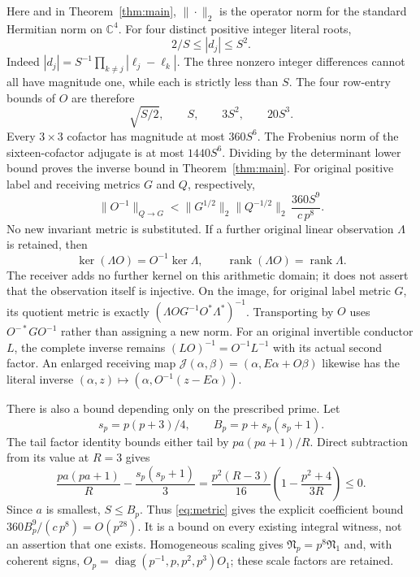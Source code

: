 Here and in Theorem~\ref{thm:main}, $\|\cdot\|_2$ is the operator norm for the
standard Hermitian norm on $\mathbb C^4$. For four distinct positive integer
literal roots,
\[
 2/S\le |d_j|\le S^2.
\]
Indeed $|d_j|=S^{-1}\prod_{k\ne j}|\ell_j-\ell_k|$. The three nonzero integer
differences cannot all have magnitude one, while each is strictly less than
$S$.
The four row-entry bounds of $O$ are therefore
\[
 \sqrt{S/2},\qquad S,\qquad3S^2,\qquad20S^3.
\]
Every $3\times3$ cofactor has magnitude at most $360S^6$. The Frobenius norm of
the sixteen-cofactor adjugate is at most $1440S^6$. Dividing by the determinant
lower bound proves the inverse bound in Theorem~\ref{thm:main}.
For original positive label and receiving metrics $G$ and $Q$, respectively,
\begin{equation}\label{eq:metric}
 \|O^{-1}\|_{Q\to G}
 <\|G^{1/2}\|_2\|Q^{-1/2}\|_2\,
       \frac{360S^9}{c\,p^8}.
\end{equation}
No new invariant metric is substituted. If a further original linear observation
$\Lambda$ is retained, then
\[
 \ker(\Lambda O)=O^{-1}\ker\Lambda,\qquad
 \operatorname{rank}(\Lambda O)=\operatorname{rank}\Lambda.
\]
The receiver adds no further kernel on this arithmetic domain; it does not
assert that the observation itself is injective. On the image, for original
label metric $G$, its quotient metric is exactly
$(\Lambda O G^{-1}O^*\Lambda^*)^{-1}$. Transporting by $O$ uses
$O^{-*}GO^{-1}$ rather than assigning a new norm.
For an original invertible conductor
$L$, the complete inverse remains $(LO)^{-1}=O^{-1}L^{-1}$ with its actual
second factor. An enlarged receiving map
$\mathcal J(\alpha,\beta)=(\alpha,E\alpha+O\beta)$ likewise has the literal
inverse $(\alpha,z)\mapsto(\alpha,O^{-1}(z-E\alpha))$.

There is also a bound depending only on the prescribed prime. Let
\[
 s_p=p(p+3)/4,\qquad B_p=p+s_p(s_p+1).
\]
The tail factor identity bounds either tail by $pa(pa+1)/R$. Direct subtraction
from its value at $R=3$ gives
\[
 \frac{pa(pa+1)}R-\frac{s_p(s_p+1)}3
 =\frac{p^2(R-3)}{16}
   \left(1-\frac{p^2+4}{3R}\right)\le0.
\]
Since $a$ is smallest, $S\le B_p$. Thus \eqref{eq:metric} gives the explicit
coefficient bound $360B_p^9/(c\,p^8)=O(p^{28})$. It is a bound on every existing
integral witness, not an assertion that one exists. Homogeneous scaling gives
$\mathfrak N_p=p^8\mathfrak N_1$ and, with coherent signs,
$O_p=\operatorname{diag}(p^{-1},p,p^2,p^3)O_1$; these scale factors are retained.

